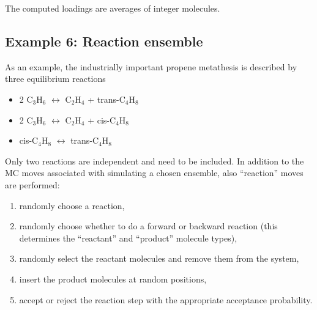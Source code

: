 The computed loadings are averages of integer molecules.

\subsection*{Example 6: Reaction ensemble}

As an example, the industrially important propene metathesis is described by three equilibrium reactions
\begin{itemize}
\item{2 C$_3$H$_6$ $\leftrightarrow$ C$_2$H$_4$ + trans-C$_4$H$_8$}
\item{2 C$_3$H$_6$ $\leftrightarrow$ C$_2$H$_4$ + cis-C$_4$H$_8$}
\item{cis-C$_4$H$_8$ $\leftrightarrow$ trans-C$_4$H$_8$}
\end{itemize}
Only two reactions are independent and need to be included. In addition to the MC moves associated with
simulating a chosen ensemble, also ``reaction'' moves are performed:
\begin{enumerate}
\item{randomly choose a reaction,}
\item{randomly choose whether to do a forward or backward reaction (this determines the ``reactant'' and ``product'' molecule types),}
\item{randomly select the reactant molecules and remove them from the system},
\item{insert the product molecules at random positions},
\item{accept or reject the reaction step with the appropriate acceptance probability.}
\end{enumerate}

